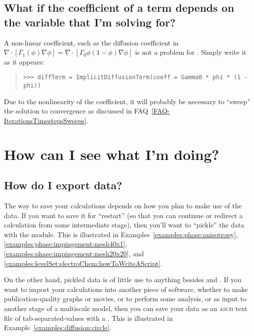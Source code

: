         \subsection{What if the coefficient of a term depends on 
            the variable that I'm solving for?}
            
            A non-linear coefficient, such as the diffusion 
            coefficient in \( 
            \nabla\cdot[\Gamma_1(\phi) \nabla \phi] = 
            \nabla\cdot[\Gamma_0 \phi (1 - \phi) \nabla\phi] \) is 
            not a problem for \FiPy. Simply write it as it appears:
            \begin{quote}
\begin{verbatim}
>>> diffTerm = ImplicitDiffusionTerm(coeff = Gamma0 * phi * (1 - phi))
\end{verbatim}
            \end{quote}
            \begin{reSTadmonition}[Note]
            Due to the nonlinearity of the coefficient, it will
            probably be necessary to ``sweep'' the solution to
            convergence as discussed in
            FAQ~\ref{FAQ-IterationsTimestepsSweeps}.
            \end{reSTadmonition}


    \section{How can I see what I'm doing?}
    
    \subsection{How do I export data?} The way to save your calculations
    depends on how you plan to make use of the data. If you want to
    save it for ``restart'' (so that you can continue or redirect a
    calculation from some intermediate stage), then you'll want to
    ``pickle'' the \Python{} data with the  module. This
    is illustrated in Examples~\ref{examples:phase:anisotropy},
    \ref{examples:phase:impingement:mesh40x1},
    \ref{examples:phase:impingement:mesh20x20}, and
    \ref{examples:levelSet:electroChem:howToWriteAScript}.
    
    On the other hand, pickled \FiPy{} data is of little use to
    anything besides \Python{} and \FiPy{}. If you want to import your
    calculations into another piece of software, whether to make
    publication-quality graphs or movies, or to perform some analysis,
    or as input to another stage of a multiscale model, then you can
    save your data as an \textsc{ascii} text file of
    tab-separated-values with a . This is 
    illustrated in Example~\ref{examples:diffusion:circle}.
    
